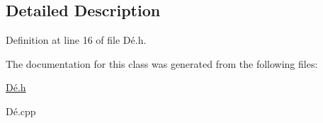 \subsection{Detailed Description}


Definition at line 16 of file Dé.h.



The documentation for this class was generated from the following files:\begin{DoxyCompactItemize}
\item 
\hyperlink{_d_xC3_xA9_8h}{Dé.h}\item 
Dé.cpp\end{DoxyCompactItemize}
